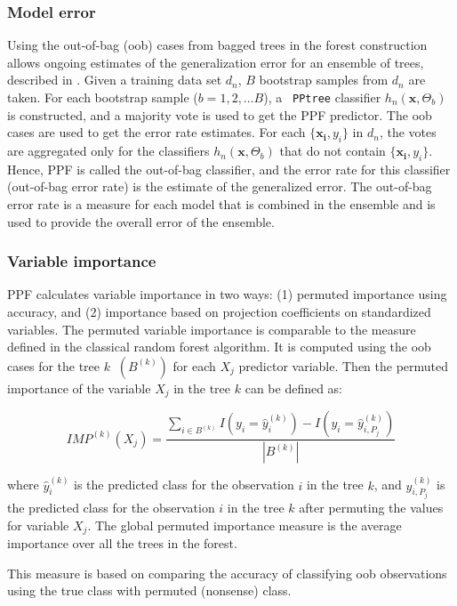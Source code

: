 \documentclass[12pt]{article}\usepackage[]{graphicx}\usepackage[]{color}
\begin{document}
\subsubsection{Model error}

Using the out-of-bag (oob) cases from bagged trees in the forest construction allows ongoing estimates of the generalization error for an ensemble of trees, described in \cite{breiman2001random}.
Given a training data set $d_n$, $B$ bootstrap samples from $d_n$ are taken. For each bootstrap sample ($b= 1, 2, \ldots B$), a \verb# PPtree# classifier $h_n(\mathbf{x}, \Theta_b)$ is constructed, and a majority vote is used to get the PPF predictor.
The oob cases are used to get the error rate estimates. For each $\{\mathbf{x_i}, y_i\}$ in $d_n$, the votes are aggregated only for the classifiers $h_n(\mathbf{x}, \Theta_b)$ that do not contain $\{\mathbf{x_i}, y_i\}$. Hence, PPF is called the out-of-bag classifier, and the error rate for this classifier (out-of-bag error rate) is the estimate of the generalized error. The out-of-bag error rate is a measure for each model that is combined in the ensemble and is used to provide the overall error of the ensemble.

\subsubsection{Variable importance}

PPF calculates variable importance in two ways: (1) permuted importance using accuracy,  and (2) importance based on projection coefficients on standardized variables.
The permuted variable importance is comparable to the measure defined in the classical random forest algorithm. It is computed using the oob cases for the tree $k\;\;(B^{(k)})$ for each $X_j$ predictor variable.  Then the
permuted importance of the variable $X_j$ in the tree $k$ can be defined as:

\[
IMP^{(k)}(X_j) = \frac{\sum_{i \in B^{(k)} } I(y_i=\hat y_i^{(k)})-I(y_i=\hat y_{i,P_j}^{(k)})}{|B^{(k)}|}
\]

\noindent where $\hat y_i^{(k)}$%
 is the predicted class for the observation $i$ in the tree $k$, and $y_{i,P_j}^{(k)}$ is the predicted class for the observation $i$ in the tree $k$ after permuting the values for variable $X_j$. The global permuted importance measure is the average importance over all the trees in the forest.
 
This measure is based on comparing the accuracy of classifying oob observations using the true class with permuted (nonsense) class.
\end{document}
